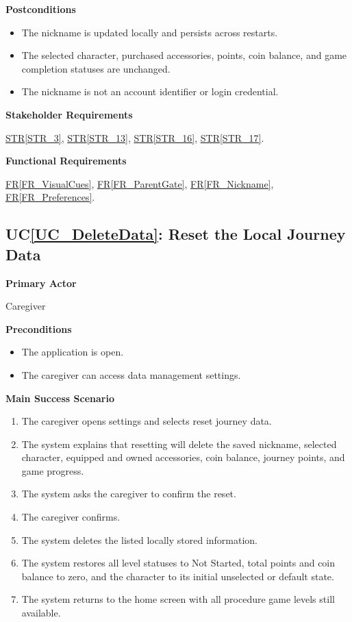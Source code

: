 \documentclass[10pt]{article}
\newcommand{\strref}[1]{\hyperref[#1]{STR\ref*{#1}}}
\newcounter{ucnum} %
\newcommand{\ucheading}[1]{UC\ref*{#1}}
\newcommand{\rref}[1]{\hyperref[#1]{FR\ref*{#1}}}
\begin{document}
\textbf{Postconditions}
\begin{itemize}
    \item The nickname is updated locally and persists across restarts.
    \item The selected character, purchased accessories, points,
    coin balance, and game completion statuses are unchanged.
    \item The nickname is not an account identifier or login credential.
\end{itemize}

\textbf{Stakeholder Requirements}

\strref{STR_3}, \strref{STR_13}, \strref{STR_16}, \strref{STR_17}.

\textbf{Functional Requirements}

\rref{FR_VisualCues}, \rref{FR_ParentGate}, \rref{FR_Nickname}, \rref{FR_Preferences}.

\label{UC_DeleteData}
\subsection{\ucheading{UC_DeleteData}: Reset the Local Journey Data}

\textbf{Primary Actor}

Caregiver

\textbf{Preconditions}
\begin{itemize}
    \item The application is open.
    \item The caregiver can access data management settings.
\end{itemize}

\textbf{Main Success Scenario}
\begin{enumerate}
    \item The caregiver opens settings and selects reset journey data.
    \item The system explains that resetting will delete the saved
    nickname, selected character, equipped and owned accessories,
    coin balance, journey points, and game progress.
    \item The system asks the caregiver to confirm the reset.
    \item The caregiver confirms.
    \item The system deletes the listed locally stored information.
    \item The system restores all level statuses to Not Started,
    total points and coin balance to zero, and the character to
    its initial unselected or default state.
    \item The system returns to the home screen with all procedure game
    levels still available.
\end{enumerate}
\end{document}
